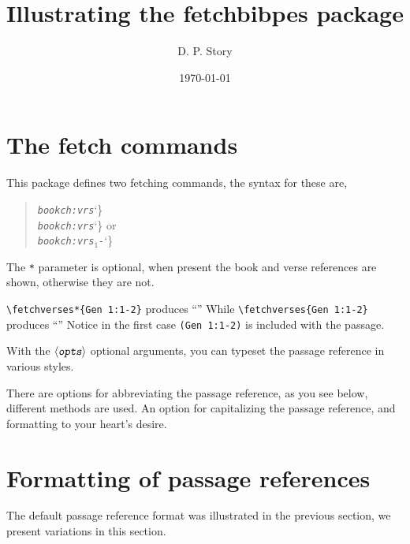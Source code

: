 \documentclass{article}
\title{Illustrating the \textsf{fetchbibpes} package}
\author{D. P. Story}
\date{\today}
\providecommand\meta[1]{\textsl{\texttt{#1}}}
\def\ameta#1{$\langle\meta{#1}\rangle$}
\providecommand\marg[1]{%
  {\ttfamily\char`\{}\meta{#1}{\ttfamily\char`\}}}
\begin{document}
\maketitle

\section{The fetch commands}

This package defines two fetching commands, the syntax for these are,
\begin{quote}\ttfamily
   \string\fetchverse[\ameta{opts}]\marg{\meta{book}\meta{ch}:\meta{vrs}}\\[3pt]
   \string\fetchverses*[\ameta{opts}]\marg{\meta{book}\meta{ch}:\meta{vrs}} or\\[3pt]
   \string\fetchverses*[\ameta{opts}]\marg{\meta{book}\meta{ch}:\meta{vrs\ensuremath{{}_1}}-\upshape[\meta{vrs\ensuremath{{}_2}}\upshape]}
\end{quote}
The \texttt{*} parameter is optional, when present the book and verse
references are shown, otherwise they are not.

\verb!\fetchverses*{Gen 1:1-2}! produces ``'' While
\verb!\fetchverses{Gen 1:1-2}! produces ``'' Notice in
the first case \texttt{(Gen 1:1-2)} is included with the passage.

With the \ameta{opts} optional arguments, you can typeset the
passage reference in various styles.

There are options for abbreviating the passage reference, as you see below,
different methods are used. An option for capitalizing the passage reference, and formatting
to your heart's desire.

\section{Formatting of passage references}

The default passage reference format was illustrated in the previous section,
we present variations in this section.

\medskip\noindent
{}

\medskip\noindent
{}

\medskip\noindent
{}
\end{document}
